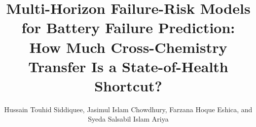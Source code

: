 \documentclass[IJPHM, 2014, 00]{PHMSociety}
\begin{document}
\title{Multi-Horizon Failure-Risk Models for Battery Failure Prediction: How Much Cross-Chemistry Transfer Is a State-of-Health Shortcut?}

\author{%
	Hussain Touhid Siddiquee, Jasimul Islam Chowdhury, Farzana Hoque Eshica, and Syeda Salsabil Islam Ariya
}

\address{%
}

\maketitle
\pagestyle{fancy}
\thispagestyle{plain}

\end{document}

